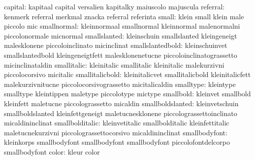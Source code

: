                   capital: kapitaal                  capital
                           versalien                 kapitalky
                           maiuscolo                 majuscula
                 referral: kenmerk                   referral
                           merkmal                   znacka
                           referral                  referinta
                    small: klein                     small
                           klein                     male
                           piccolo                   mic
              smallnormal: kleinnormaal              smallnormal
                           kleinnormal               malenormalni
                           piccolonormale            micnormal
             smallslanted: kleinschuin               smallslanted
                           kleingeneigt              malesklonene
                           piccoloinclinato          micinclinat
         smallslantedbold: kleinschuinvet            smallslantedbold
                           kleingeneigtfett          malesklonenetucne
                           piccoloinclinatograssetto micinclinataldin
              smallitalic: kleinitalic               smallitalic
                           kleinitalic               malekurzivni
                           piccolocorsivo            micitalic
          smallitalicbold: kleinitalicvet            smallitalicbold
                           kleinitalicfett           malekurzivnitucne
                           piccolocorsivograssetto   micitalicaldin
                smalltype: kleintype                 smalltype
                           kleintippen               maletype
                           piccolotype               mictype
                smallbold: kleinvet                  smallbold
                           kleinfett                 maletucne
                           piccolograssetto          micaldin
         smallboldslanted: kleinvetschuin            smallboldslanted
                           kleinfettgeneigt          maletucnesklonene
                           piccolograssettoinclinato micaldininclinat
          smallbolditalic: kleinvetitalic            smallbolditalic
                           kleinfettitalic           maletucnekurzivni
                           piccolograssettocorsivo   micaldininclinat
            smallbodyfont: kleinkorps                smallbodyfont
                           smallbodyfont             smallbodyfont
                           piccolofontdelcorpo       smallbodyfont %
                    color: kleur                     color
